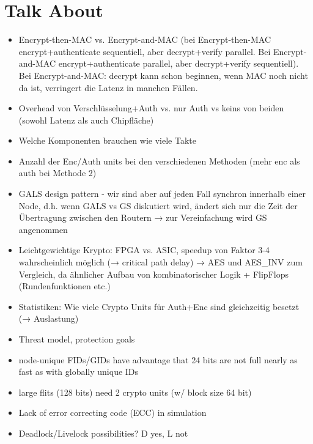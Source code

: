 \documentclass[
	paper=a4,
	fontsize=11pt,
	parskip=full %
]{scrreprt}
\begin{document}
    \chapter{Talk About}
    \begin{itemize}
        \item Encrypt-then-MAC vs. Encrypt-and-MAC (bei Encrypt-then-MAC encrypt+authenticate sequentiell, aber decrypt+verify parallel.
            Bei Encrypt-and-MAC encrypt+authenticate parallel, aber decrypt+verify sequentiell). Bei Encrypt-and-MAC: decrypt kann schon
            beginnen, wenn MAC noch nicht da ist, verringert die Latenz in manchen Fällen.
        \item Overhead von Verschlüsselung+Auth vs. nur Auth vs keins von beiden (sowohl Latenz als auch Chipfläche)
        \item Welche Komponenten brauchen wie viele Takte
        \item Anzahl der Enc/Auth units bei den verschiedenen Methoden (mehr enc als auth bei Methode 2)
        \item GALS design pattern - wir sind aber auf jeden Fall synchron innerhalb einer Node, d.h. wenn GALS vs GS diskutiert wird,
            ändert sich nur die Zeit der Übertragung zwischen den Routern → zur Vereinfachung wird GS angenommen
        \item Leichtgewichtige Krypto: FPGA vs. ASIC, speedup von Faktor 3-4 wahrscheinlich möglich (→ critical path delay) \cite{kuon07fpgavsasic}
            → AES und AES\_INV zum Vergleich, da ähnlicher Aufbau von kombinatorischer Logik + FlipFlops (Rundenfunktionen etc.)
        \item Statistiken: Wie viele Crypto Units für Auth+Enc sind gleichzeitig besetzt (→ Auslastung)
        \item Threat model, protection goals
        \item node-unique FIDs/GIDs have advantage that 24 bits are not full nearly as fast as with globally unique IDs
		\item large flits (128 bits) need 2 crypto units (w/ block size 64 bit)
        \item Lack of error correcting code (ECC) in simulation
        \item Deadlock/Livelock possibilities? D yes, L not
    \end{itemize}
\end{document}
